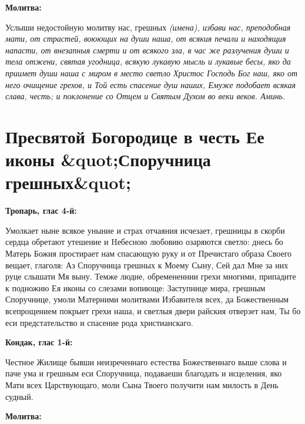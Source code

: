 \medskip


\bfseries Молитва:\normalfont{}


Услыши недостойную молитву нас, грешных \itshape (имена),\normalfont{} избави нас, преподобная мати, от страстей, воюющих на души наша, от всякия печали и находящия напасти, от внезапныя смерти и от всякого зла, в час же разлучения души и тела отжени, святая угодница, всякую лукавую мысль и лукавые бесы, яко да приимет души наша с миром в место светло Христос Господь Бог наш, яко от него очищение грехов, и Той есть спасение душ наших, Емуже подобает всякая слава, честь; и поклонение со Отцем и Святым Духом во веки веков. Аминь.


\section{Пресвятой Богородице в честь Ее иконы &quot;Споручница грешных&quot;}
 


\bfseries Тропарь, глас 4-й:\normalfont{}


Умолкает ныне всякое уныние и страх отчаяния исчезает, грешницы в скорби сердца обретают утешение и Hебесною любовию озаряются светло: днесь бо Матерь Божия простирает нам спасающую руку и от Пречистаго образа Своего вещает, глаголя: Аз Споручница грешных к Моему Сыну, Сей дал Мне за них руце слышати Мя выну. Темже людие, обремененнии грехи многими, припадите к подножию Ея иконы со слезами вопиюще: Заступнице мира, грешным Споручнице, умоли Матерними молитвами Избавителя всех, да Божественным всепрощением покрыет грехи наша, и светлыя двери райския отверзет нам, Ты бо еси предстательство и спасение рода христианскаго.


\medskip


\bfseries Кондак, глас 1-й:\normalfont{}


Честное Жилище бывши неизреченнаго естества Божественнаго выше слова и паче ума и грешным еси Споручница, подаваеши благодать и исцеления, яко Мати всех Царствующаго, моли Сына Твоего получити нам милость в День судный.


\medskip


\bfseries Молитва:\normalfont{}


